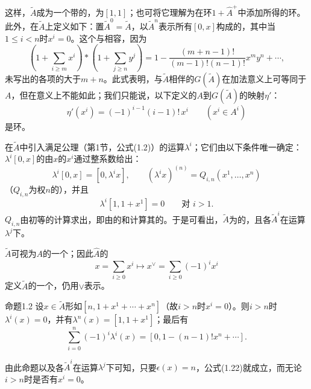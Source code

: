 这样，$\widetilde A$成为一个带的，为$[1,1]$；也可将它理解为在环$1+\widehat A^+$中添加所得的环。此外，在$\widetilde A$上定义如下：置$\widetilde A^0=\widetilde A$，以$\widetilde A^n$表示所有$[0,x]$构成的，其中当$1\leq i<n$时$x^i=0$。这个与相容，因为
\begin{equation}
\left(1+\sum_{i\geq m}x^i\right)*\left(1+\sum_{j\geq n}y^j\right)
=1-\frac{(m+n-1)!}{(m-1)!(n-1)!}x^my^n+\cdots,\tag{1.18}
\end{equation}
未写出的各项的大于$m+n$。此式表明，与$\widetilde A$相伴的$G(\widetilde A)$在加法意义上可等同于$A$，但在意义上不能如此；我们只能说，以下定义的$A$到$G(\widetilde A)$的映射$\eta'$：
\begin{equation}\eta'(x^i)=(-1)^{i-1}(i-1)!\,x^i\qquad(x^i\in A^i)\tag{1.19}\end{equation}
是环。

在$\widetilde A$中引入满足公理（第1节，公式(1.2)）的运算$\lambda^i$；它们由以下条件唯一确定：$\lambda^i[0,x]$的由$x$的$x^i$通过整系数给出：
\begin{equation}\lambda^i[0,x]=[0,\lambda^ix],\qquad
(\lambda^ix)^{(n)}=Q_{i,n}(x^1,\ldots,x^n)\tag{1.20}\end{equation}
（$Q_{i,n}$为权$n$的），并且
\begin{equation}\lambda^i[1,1+x^1]=0\qquad\text{对 }i>1.\tag{1.21}\end{equation}
$Q_{i,n}$由初等的计算求出，即由的和计算其的。于是可看出，$\widetilde A$为的，且各$\widetilde A^i$在运算$\lambda^j$下。

$\widetilde A$可视为$A$的一个；因此$\widehat A$的
\[x=\sum_{i\geq0}x^i\longmapsto x^\vee=\sum_{i\geq0}(-1)^ix^i\]
定义$\widetilde A$的一个，仍用$\vee$表示。
\begin{SGAresult}{命题}{1.2}
设$x\in\widetilde A$形如$[n,1+x^1+\cdots+x^n]$（故$i>n$时$x^i=0$）。则$i>n$时$\lambda^i(x)=0$，并有$\lambda^n(x)=[1,1+x^1]$；最后有
\begin{equation}\sum_{i=0}^n(-1)^i\lambda^i(x)=[0,1-(n-1)!x^n+\cdots].\tag{1.22}\end{equation}
\end{SGAresult}
由此命题以及各$\widetilde A^i$在运算$\lambda^j$下可知，只要$\epsilon(x)=n$，公式(1.22)就成立，而无论$i>n$时是否有$x^i=0$。

